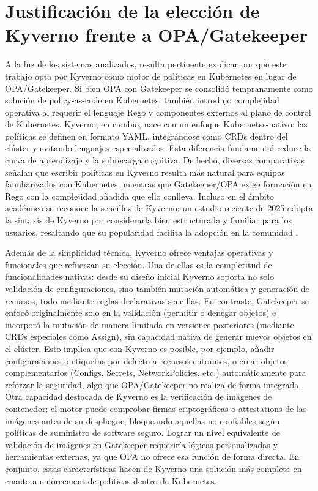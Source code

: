 \documentclass[12pt,twoside,titlepage]{report}
\begin{document}
\section{Justificación de la elección de Kyverno frente a OPA/Gatekeeper}

A la luz de los sistemas analizados, resulta pertinente explicar por qué este trabajo opta por Kyverno como motor de políticas en Kubernetes en lugar de OPA/Gatekeeper. Si bien OPA con Gatekeeper se consolidó tempranamente como solución de policy-as-code en Kubernetes, también introdujo complejidad operativa al requerir el lenguaje Rego y componentes externos al plano de control de Kubernetes. Kyverno, en cambio, nace con un enfoque Kubernetes-nativo: las políticas se definen en formato YAML, integrándose como CRDs dentro del clúster y evitando lenguajes especializados\cite{zoller2022kyverno}. Esta diferencia fundamental reduce la curva de aprendizaje y la sobrecarga cognitiva. De hecho, diversas comparativas señalan que escribir políticas en Kyverno resulta más natural para equipos familiarizados con Kubernetes, mientras que Gatekeeper/OPA exige formación en Rego con la complejidad añadida que ello conlleva. Incluso en el ámbito académico se reconoce la sencillez de Kyverno: un estudio reciente de 2025 adopta la sintaxis de Kyverno por considerarla bien estructurada y familiar para los usuarios, resaltando que su popularidad facilita la adopción en la comunidad \cite{chen2025policyrule}. 

Además de la simplicidad técnica, Kyverno ofrece ventajas operativas y funcionales que refuerzan su elección. Una de ellas es la completitud de funcionalidades nativas: desde su diseño inicial Kyverno soporta no solo validación de configuraciones, sino también mutación automática y generación de recursos, todo mediante reglas declarativas sencillas. En contraste, Gatekeeper se enfocó originalmente solo en la validación (permitir o denegar objetos) e incorporó la mutación de manera limitada en versiones posteriores (mediante CRDs especiales como Assign), sin capacidad nativa de generar nuevos objetos en el clúster. Esto implica que con Kyverno es posible, por ejemplo, añadir configuraciones o etiquetas por defecto a recursos entrantes, o crear objetos complementarios (Configs, Secrets, NetworkPolicies, etc.) automáticamente para reforzar la seguridad, algo que OPA/Gatekeeper no realiza de forma integrada. Otra capacidad destacada de Kyverno es la verificación de imágenes de contenedor: el motor puede comprobar firmas criptográficas o attestations de las imágenes antes de su despliegue, bloqueando aquellas no confiables según políticas de suministro de software seguro. Lograr un nivel equivalente de validación de imágenes en Gatekeeper requeriría lógicas personalizadas y herramientas externas, ya que OPA no ofrece esa función de forma directa. En conjunto, estas características hacen de Kyverno una solución más completa en cuanto a enforcement de políticas dentro de Kubernetes. 
\end{document}
